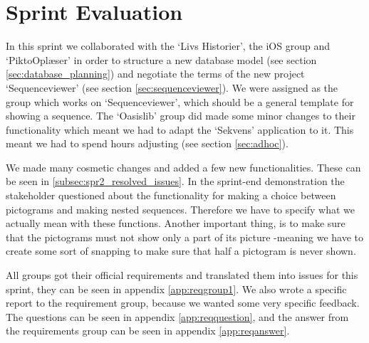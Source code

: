 \section{Sprint Evaluation}\label{sec:spr2_spreval}
In this sprint we collaborated with the `Livs Historier', the iOS group and `PiktoOplæser' in order to structure a new database model (see section \ref{sec:database_planning}) and negotiate the terms of the new project `Sequenceviewer' (see section \ref{sec:sequenceviewer}).
We were assigned as the group which works on `Sequenceviewer', which should be a general template for showing a sequence.
The `Oasislib' group did made some minor changes to their functionality which meant we had to adapt the `Sekvens' application to it. This meant we had to spend hours adjusting (see section \ref{sec:adhoc}).

We made many cosmetic changes and added a few new functionalities. These can be seen in \ref{subsec:spr2_resolved_issues}.
In the sprint-end demonstration the stakeholder questioned about the functionality for making a choice between pictograms and making nested sequences.
Therefore we have to specify what we actually mean with these functions.
Another important thing, is to make sure that the pictograms must not show only a part of its picture -meaning we have to create some sort of snapping to make sure that half a pictogram is never shown.

All groups got their official requirements and translated them into issues for this sprint, they can be seen in appendix \ref{app:reqgroup1}. We also wrote a specific report to the requirement group, because we wanted some very specific feedback. The questions can be seen in appendix \ref{app:reqquestion}, and the answer from the requirements group can be seen in appendix \ref{app:reqanswer}.